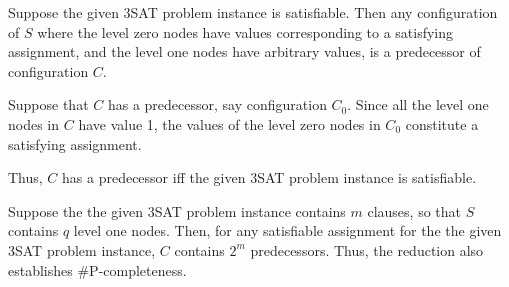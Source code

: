 \smallskip
Suppose the given 3SAT problem instance is satisfiable.
Then any configuration of $S$ where the level zero nodes 
have values corresponding to a satisfying assignment,
and the level one nodes have arbitrary values,
is a predecessor of configuration $C$.

\smallskip

Suppose that $C$ has a predecessor, say configuration $C_0$.
Since all the level one nodes in $C$ have value 1,
the values of the level zero nodes in $C_0$ constitute a satisfying assignment.

\smallskip
Thus, $C$ has a predecessor iff the given 3SAT problem instance is satisfiable.

\smallskip
Suppose the the given 3SAT problem instance contains $m$ clauses,
so that $S$ contains $q$ level one nodes.
Then, for any satisfiable assignment for the the given 3SAT problem instance,
$C$ contains $2^m$ predecessors.
Thus, the reduction also establishes \#P-completeness.
\QED
